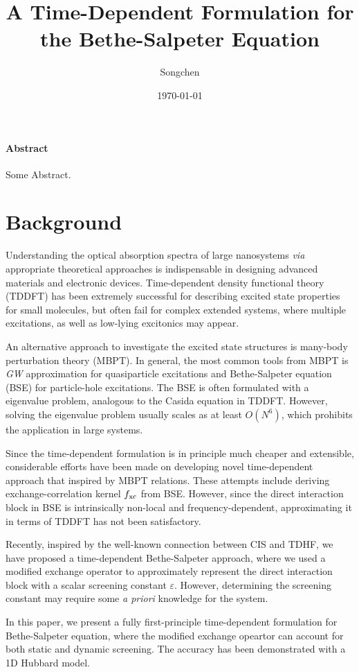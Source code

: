 \documentclass{article}
\title{A Time-Dependent Formulation for the Bethe-Salpeter Equation}
\author{Songchen}
\date{\today}
\begin{document}
\maketitle
\paragraph{Abstract} Some Abstract.
\section{Background}
Understanding the optical absorption spectra of large nanosystems \emph{via} appropriate theoretical approaches is indispensable in designing advanced materials and electronic devices. Time-dependent density functional theory (TDDFT) has been extremely successful for describing excited state properties for small molecules, but often fail for complex extended systems, where multiple excitations, as well as low-lying excitonics may appear.

An alternative approach to investigate the excited state structures is many-body perturbation theory (MBPT). In general, the most common tools from MBPT is \emph{GW} approximation for quasiparticle excitations and Bethe-Salpeter equation (BSE) for particle-hole excitations. The BSE is often formulated with a eigenvalue problem, analogous to the Casida equation in TDDFT. However, solving the eigenvalue problem usually scales as at least $O(N^6)$, which prohibits the application in large systems.

Since the time-dependent formulation is in principle much cheaper and extensible, considerable efforts have been made on developing novel time-dependent approach that inspired by MBPT relations. These attempts include deriving exchange-correlation kernel $f_{\rm xc}$ from BSE. However, since the direct interaction block in BSE is intrinsically non-local and frequency-dependent, approximating it in terms of TDDFT has not been satisfactory.

Recently, inspired by the well-known connection between CIS and TDHF, we have proposed a time-dependent Bethe-Salpeter approach, where we used a modified exchange operator to approximately represent the direct interaction block with a scalar screening constant $\varepsilon$. However, determining the screening constant may require some \emph{a priori} knowledge for the system.

In this paper, we present a fully first-principle time-dependent formulation for Bethe-Salpeter equation, where the modified exchange opeartor can account for both static and dynamic screening. The accuracy has been demonstrated with a 1D Hubbard model.
\end{document}
